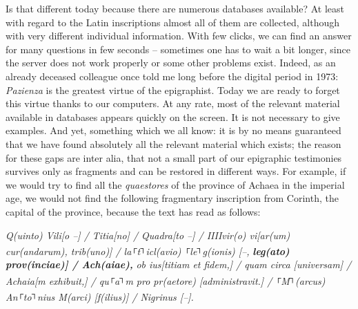 \documentclass{article}
\begin{document}
Is that different today because there are numerous databases available? At least 
with regard to the Latin inscriptions almost all of them are collected, although 
with very different individual information. With few clicks, we can find an answer 
for many questions in few seconds – sometimes one has to wait a bit longer, since 
the server does not work properly or some other problems exist. Indeed, as an already 
deceased colleague once told me long before the digital period in 1973: \textit{Pazienza} 
is the greatest virtue of the epigraphist. Today we are ready to forget this virtue 
thanks to our computers. At any rate, most of the relevant material available in 
databases appears quickly on the screen. It is not necessary to give examples. 
And yet, something which we all know: it is by no means guaranteed that we have 
found absolutely all the relevant material which exists; the reason for these gaps 
are inter alia, that not a small part of our epigraphic testimonies survives only 
as fragments and can be restored in different ways. For example, if we would try 
to find all the \textit{quaestores }of the province of Achaea in the imperial age, 
we would not find the following fragmentary inscription from Corinth, the capital 
of the province, because the text has read as follows: 

\textit{Q(uinto) Vili[o --] / Titia[no] / Quadra[to --] / IIIIvir(o) vi[ar(um) 
cur(andarum), trib(uno)] / la}\textsuperscript{\textit{┌}}\textit{t}\textsuperscript{\textit{┐}}\textit{icl(avio) 
}\textsuperscript{\textit{┌}}\textit{le}\textsuperscript{\textit{┐}}\textit{g(ionis) 
[--, }\textit{\textbf{leg(ato) prov(inciae)] / Ach(aiae),}}\textit{ ob ius[titiam 
et fidem,] / quam circa [universam] / Achaia[m exhibuit,] / qu}\textsuperscript{\textit{┌}}\textit{a}\textsuperscript{\textit{┐}}\textit{m 
pro pr(aetore) [administravit.] / }\textsuperscript{\textit{┌}}\textit{M}\textsuperscript{\textit{┐}}\textit{(arcus) 
An}\textsuperscript{\textit{┌}}\textit{to}\textsuperscript{\textit{┐}}\textit{nius 
M(arci) [f(ilius)] / Nigrinus [--].}
\end{document}
